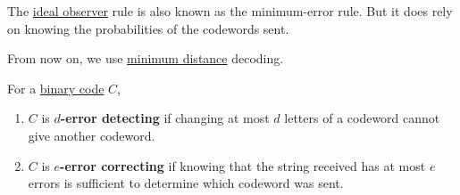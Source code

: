 \documentclass{article}
\newcommand{\1}[1]{\mathbbm{1}_{#1}}
\begin{document}
\begin{remark}
    The \hyperlink{def:idealObserver}{ideal observer} rule is also known as the minimum-error rule.
    But it does rely on knowing the probabilities of the codewords sent.
\end{remark}
From now on, we use \hyperlink{def:minimumDistanceRule}{minimum distance} decoding.
\begin{defi}
    For a \hyperlink{def:binaryCode}{binary code} $C$,
    \begin{enumerate}[label=(\roman*)]
        \item $C$ is \hypertarget{def:errorDet}{\textbf{$d$-error detecting}} if changing at most $d$ letters of a codeword cannot give another codeword.
        \item $C$ is \hypertarget{def:errorCor}{\textbf{$e$-error correcting}} if knowing that the string received has at most $e$ errors is sufficient to determine which codeword was sent.
    \end{enumerate}
\end{defi}
\end{document}
